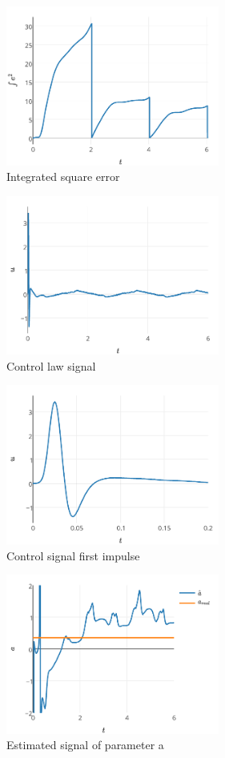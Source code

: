 \documentclass[journal]{IEEEtran}
\begin{document}
    \begin{figure}[!t]
        \centering
        \includegraphics[width=7cm]{IEC}
        \caption{Integrated square error}
        \label{fig_iec}
    \end{figure}

    \begin{figure}[!t]
        \centering
        \includegraphics[width=7cm]{control}
        \caption{Control law signal}
        \label{fig_control}
    \end{figure}

    \begin{figure}[!t]
        \centering
        \includegraphics[width=7cm]{controlimpulse}
        \caption{Control signal first impulse}
        \label{fig_controlimpulse}
    \end{figure}

    \begin{figure}[!t]
        \centering
        \includegraphics[width=7cm]{parametroa}
        \caption{Estimated signal of parameter a}
        \label{fig_parametroa}
    \end{figure}
\end{document}
